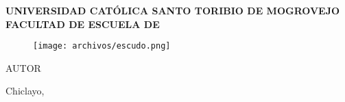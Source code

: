 \pagestyle{empty}
\begin{center}\bf
UNIVERSIDAD CATÓLICA SANTO TORIBIO DE MOGROVEJO\break
FACULTAD DE \MakeUppercase{\Facultad}\break
ESCUELA DE\MakeUppercase{\Escuela}

\begin{figure}[h]
    \centering\texttt{[image: archivos/escudo.png]}
\end{figure}

{\large\TituloProyecto}\break\break
AUTOR\break
{\Autor}\break

Chiclayo,\Fecha
\end{center}

\newpage

\begin{center}
\renewcommand\contentsname{\large Índice}
\tableofcontents

\newpage

\renewcommand\listtablename{\large Lista de tablas}
\listoftables

\newpage

\renewcommand\listfigurename{\large Lista de figuras}
\listoffigures

\newpage

\listofannexes
\end{center}
\newpage

\pagestyle{fancy}
